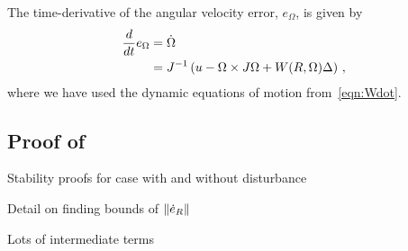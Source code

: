 \documentclass[letterpaper, 10 pt, conference]{ieeeconf}  %
\begin{document}
The time-derivative of the angular velocity error, \( e_\Omega \), is given by
\begin{align*}
	\frac{d }{d t} e_\Omega &= \dot{\Omega} \\
	&= J^{-1} \left( u - \Omega \times J \Omega + W(R,\Omega) \Delta  \right) \, ,
\end{align*}
where we have used the dynamic equations of motion from~\cref{eqn:Wdot}. 
\subsection{Proof of }
Stability proofs for case with and without disturbance



Detail on finding bounds of \( \left\| \dot{e}_R \right\| \)

Lots of intermediate terms



\addtolength{\textheight}{-12cm}   %
                                  


\end{document}
